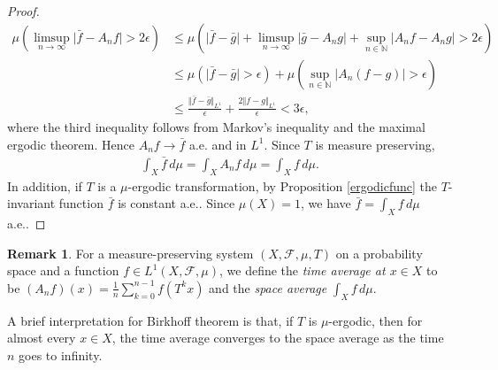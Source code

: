 \documentclass{article}
\numberwithin{equation}{section}
\newcommand{\bbN}{\mathbb{N}}
\newcommand{\scr}{\mathscr}
\theoremstyle{plain}
\theoremstyle{definition}
\newtheorem*{remark}{Remark}
\begin{document}
\begin{proof}
\begin{align*}
	\mu\left(\limsup_{n\to\infty}\vert\bar{f}-A_nf\vert>2\epsilon\right)&\leq\mu\left(\vert\bar{f}-\bar{g}\vert+\limsup_{n\to\infty}\vert\bar{g}-A_ng\vert+\sup_{n\in\bbN}\vert A_nf-A_ng\vert>2\epsilon\right)\\
	&\leq\mu\left(\vert\bar{f}-\bar{g}\vert>\epsilon\right)+\mu\left(\sup_{n\in\bbN}\vert A_n(f-g)\vert>\epsilon\right)\\
	&\leq\frac{\Vert\bar{f}-\bar{g}\Vert_{L^1}}{\epsilon}+\frac{2\Vert f-g\Vert_{L^1}}{\epsilon}<3\epsilon,
\end{align*}
where the third inequality follows from Markov's inequality and the maximal ergodic theorem. Hence $A_nf\to\bar{f}$ a.e. and in $L^1$. Since $T$ is measure preserving,
\begin{align*}
	\int_X\bar{f}\,d\mu=\int_XA_nf\,d\mu=\int_X f\,d\mu.
\end{align*}
In addition, if $T$ is a $\mu$-ergodic transformation, by Proposition \ref{ergodicfunc} the $T$-invariant function $\bar{f}$ is constant a.e.. Since $\mu(X)=1$, we have $\bar{f}=\int_X f\,d\mu$ a.e..
\end{proof}

\begin{remark}
For a measure-preserving system $(X,\scr{F},\mu,T)$ on a probability space and a function $f\in L^1(X,\scr{F},\mu)$, we define the \textit{time average at $x\in X$} to be $(A_nf)(x)=\frac{1}{n}\sum_{k=0}^{n-1} f(T^k x)$ and the \textit{space average} $\int_X f\,d\mu$. 

A brief interpretation for Birkhoff theorem is that, if $T$ is $\mu$-ergodic, then for almost every $x\in X$, the time average converges to the space average as the time $n$ goes to infinity.
\end{remark}
\end{document}
